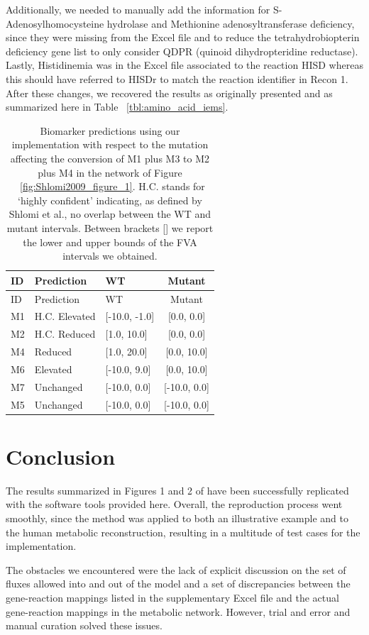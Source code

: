\documentclass[10pt,a4paper,onecolumn]{article}
\begin{document}
Additionally, we needed to manually add the information for
S-Adenosylhomocysteine hydrolase and Methionine adenosyltransferase
deficiency, since they were missing from the Excel file and to reduce
the tetrahydrobiopterin deficiency gene list to only consider QDPR
(quinoid dihydropteridine reductase). Lastly, Histidinemia was in the
Excel file associated to the reaction HISD whereas this should have
referred to HISDr to match the reaction identifier in Recon 1. After
these changes, we recovered the results as originally presented and as
summarized here in Table ~\ref{tbl:amino_acid_iems}.

\hypertarget{tbl:toy_model_results}{}
\begin{longtable}[]{@{}lllc@{}}
\caption{\label{tbl:toy_model_results}Biomarker predictions using our
implementation with respect to the mutation affecting the conversion of
M1 plus M3 to M2 plus M4 in the network of Figure
~\ref{fig:Shlomi2009_figure_1}. H.C. stands for `highly confident'
indicating, as defined by Shlomi et al., no overlap between the WT and
mutant intervals. Between brackets {[}{]} we report the lower and upper
bounds of the FVA intervals we obtained. }\tabularnewline
\toprule
ID & Prediction & WT & Mutant\tabularnewline
\midrule
\endfirsthead
\toprule
ID & Prediction & WT & Mutant\tabularnewline
\midrule
\endhead
M1 & H.C. Elevated & {[}-10.0, -1.0{]} & {[}0.0, 0.0{]}\tabularnewline
M2 & H.C. Reduced & {[}1.0, 10.0{]} & {[}0.0, 0.0{]}\tabularnewline
M4 & Reduced & {[}1.0, 20.0{]} & {[}0.0, 10.0{]}\tabularnewline
M6 & Elevated & {[}-10.0, 9.0{]} & {[}0.0, 10.0{]}\tabularnewline
M7 & Unchanged & {[}-10.0, 0.0{]} & {[}-10.0, 0.0{]}\tabularnewline
M5 & Unchanged & {[}-10.0, 0.0{]} & {[}-10.0, 0.0{]}\tabularnewline
\bottomrule
\end{longtable}

\section{Conclusion}\label{conclusion}

The results summarized in Figures 1 and 2 of \autocite{Shlomi2009} have
been successfully replicated with the software tools provided here.
Overall, the reproduction process went smoothly, since the method was
applied to both an illustrative example and to the human metabolic
reconstruction, resulting in a multitude of test cases for the
implementation.

The obstacles we encountered were the lack of explicit discussion on the
set of fluxes allowed into and out of the model and a set of
discrepancies between the gene-reaction mappings listed in the
supplementary Excel file and the actual gene-reaction mappings in the
metabolic network. However, trial and error and manual curation solved
these issues.
\end{document}
